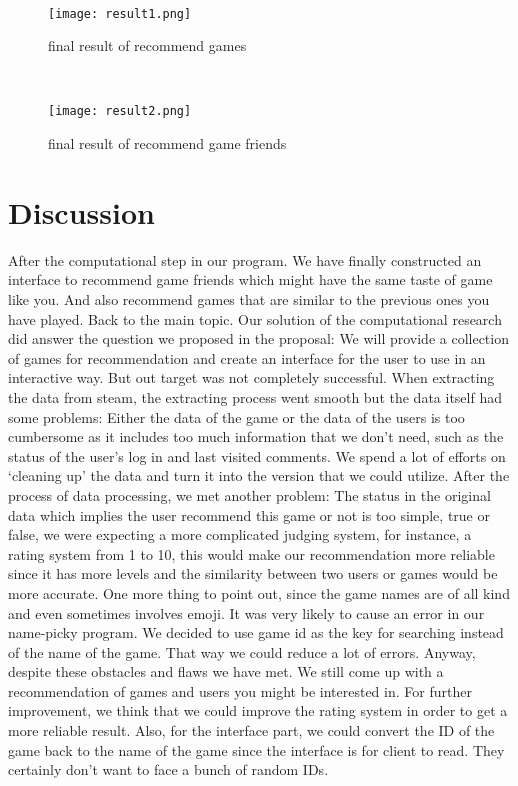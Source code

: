 \documentclass[fontsize=11pt]{article}
\begin{document}
    \\
    \begin{figure}[H]
        \centering
        \texttt{[image: result1.png]}
        \caption{final result of recommend games}
        \label{fig:my_label}
    \end{figure}
    \\
    \begin{figure}[H]
        \centering
        \texttt{[image: result2.png]}
        \caption{final result of recommend game friends}
        \label{fig:my_label}
    \end{figure}
    

    \section*{Discussion}
    
    After the computational step in our program. We have finally constructed an interface  to recommend game friends which might have the same taste of game like you. And also recommend games that are similar to the previous ones you have played. Back to the main topic. Our solution of the computational research did answer the question we proposed in the proposal: We will provide a collection of games for recommendation and create an interface for the user to use in an interactive way. But out target was not completely successful. When extracting the data from steam, the extracting process went smooth but the data itself had some problems: Either the data of the game or the data of the users is too cumbersome as it includes too much information that we don’t need, such as the status of the user’s log in and last visited comments. We spend a lot of efforts on ‘cleaning up’ the data and turn it into the version that we could utilize. After the process of data processing, we met another problem: The status in the original data which implies the user recommend this game or not is too simple, true or false, we were expecting a more complicated judging system, for instance, a rating system from 1 to 10, this would make our recommendation more reliable since it has more levels and the similarity between two users or games would be more accurate. One more thing to point out, since the game names are of all kind and even sometimes involves emoji. It was very likely to cause an error in our name-picky program. We decided to use game id as the key for searching instead of the name of the game. That way we could reduce a lot of errors. Anyway, despite these obstacles and flaws we have met. We still come up with a recommendation of games and users you might be interested in. For further improvement, we think that we could improve the rating system in order to get a more reliable result. Also, for the interface part, we could convert the ID of the game back to the name of the game since the interface is for client to read. They certainly don’t want to face a bunch of random IDs.
\end{document}
